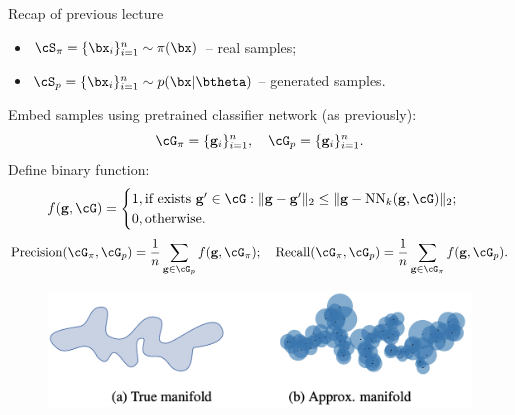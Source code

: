 

\begin{frame}
\titlepage
\end{frame}
\begin{frame}{Recap of previous lecture}
		\begin{itemize}
			\item $\cS_{\pi} = \{\bx_i\}_{i=1}^{n} \sim \pi(\bx)$ -- real samples;
			\item $\cS_{p} = \{\bx_i\}_{i=1}^{n} \sim p(\bx | \btheta)$ -- generated samples.
		\end{itemize}
		Embed samples using pretrained classifier network (as previously):
		\[
			\cG_{\pi} = \{\mathbf{g}_i\}_{i=1}^n, \quad \cG_{p} = \{\mathbf{g}_i\}_{i=1}^n.
		\]
		Define binary function:
		\[
			f(\mathbf{g}, \cG) = 
			\begin{cases}
				1, \text{if exists } \mathbf{g}' \in \cG: \| \mathbf{g}  - \mathbf{g}'\|_2 \leq \| \mathbf{g} - \text{NN}_k(\mathbf{g}, \cG)\|_2; \\
				0, \text{otherwise.}
			\end{cases}
		\]
		\[
			\text{Precision} (\cG_{\pi}, \cG_{p}) = \frac{1}{n} \sum_{\mathbf{g} \in \cG_{p}} f(\mathbf{g}, \cG_{\pi}); \quad \text{Recall} (\cG_{\pi}, \cG_{p}) = \frac{1}{n} \sum_{\mathbf{g} \in \cG_{\pi}} f(\mathbf{g}, \cG_{p}).
		\]
		\vspace{-0.4cm}
		\begin{figure}
			\includegraphics[width=0.7\linewidth]{figs/pr_k_nearest}
		\end{figure}
\end{frame}
